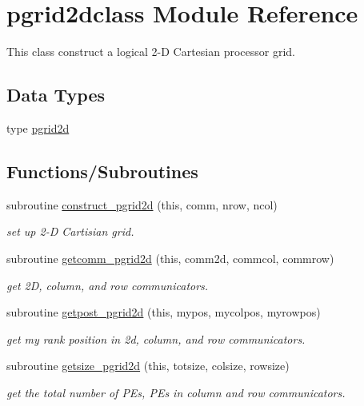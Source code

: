 \hypertarget{namespacepgrid2dclass}{}\section{pgrid2dclass Module Reference}
\label{namespacepgrid2dclass}


This class construct a logical 2-\/D Cartesian processor grid.  


\subsection*{Data Types}
\begin{DoxyCompactItemize}
\item 
type \mbox{\hyperlink{namespacepgrid2dclass_structpgrid2dclass_1_1pgrid2d}{pgrid2d}}
\end{DoxyCompactItemize}
\subsection*{Functions/\+Subroutines}
\begin{DoxyCompactItemize}
\item 
subroutine \mbox{\hyperlink{namespacepgrid2dclass_a93b626c7a473ab28463a29b9661dcefb}{construct\+\_\+pgrid2d}} (this, comm, nrow, ncol)
\begin{DoxyCompactList}\small\item\em set up 2-\/D Cartisian grid. \end{DoxyCompactList}\item 
subroutine \mbox{\hyperlink{namespacepgrid2dclass_a550cb1b5c94a9e168c3e0108bb8a6d5b}{getcomm\+\_\+pgrid2d}} (this, comm2d, commcol, commrow)
\begin{DoxyCompactList}\small\item\em get 2D, column, and row communicators. \end{DoxyCompactList}\item 
subroutine \mbox{\hyperlink{namespacepgrid2dclass_a559d4550356f88440ae55fceda480de2}{getpost\+\_\+pgrid2d}} (this, mypos, mycolpos, myrowpos)
\begin{DoxyCompactList}\small\item\em get my rank position in 2d, column, and row communicators. \end{DoxyCompactList}\item 
subroutine \mbox{\hyperlink{namespacepgrid2dclass_ac088657db5b1deb05bb1ec732579ba53}{getsize\+\_\+pgrid2d}} (this, totsize, colsize, rowsize)
\begin{DoxyCompactList}\small\item\em get the total number of P\+Es, P\+Es in column and row communicators. \end{DoxyCompactList}\end{DoxyCompactItemize}


